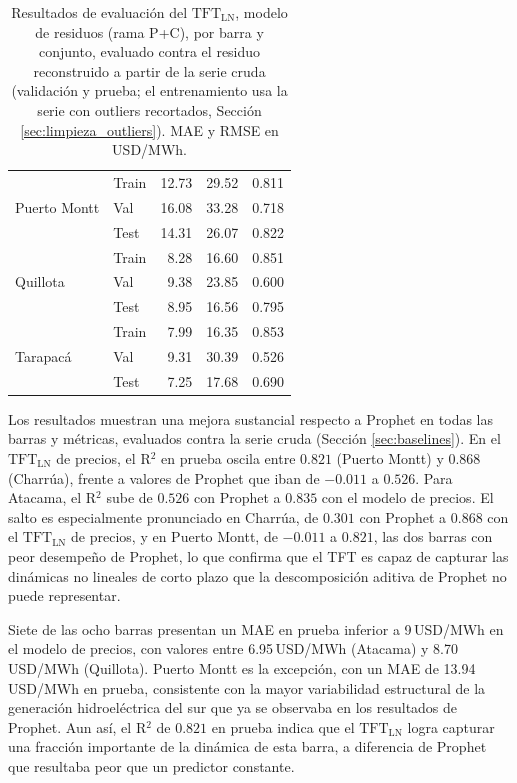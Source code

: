 \begin{table}[htbp]
\begin{tabular}{llrrr}
        \midrule
        \multirow{3}{*}{Puerto Montt}
            & Train & 12.73 & 29.52 & 0.811 \\
            & Val   & 16.08 & 33.28 & 0.718 \\
            & Test  & 14.31 & 26.07 & 0.822 \\
        \midrule
        \multirow{3}{*}{Quillota}
            & Train & 8.28 & 16.60 & 0.851 \\
            & Val   & 9.38 & 23.85 & 0.600 \\
            & Test  & 8.95 & 16.56 & 0.795 \\
        \midrule
        \multirow{3}{*}{Tarapacá}
            & Train & 7.99 & 16.35 & 0.853 \\
            & Val   & 9.31 & 30.39 & 0.526 \\
            & Test  & 7.25 & 17.68 & 0.690 \\
        \bottomrule
    \end{tabular}
    \vspace{0.2cm}
    \caption{Resultados de evaluación del $\text{TFT}_\text{LN}$, modelo de residuos (rama P+C), por barra y conjunto, evaluado contra el residuo reconstruido a partir de la serie cruda (validación y prueba; el entrenamiento usa la serie con outliers recortados, Sección \ref{sec:limpieza_outliers}). MAE y RMSE en USD/MWh.}
    \label{tab:tft_residuos_resultados}
\end{table}
 
Los resultados muestran una mejora sustancial respecto a Prophet en todas las barras y métricas, evaluados contra la serie cruda (Sección \ref{sec:baselines}). En el $\text{TFT}_\text{LN}$ de precios, el R$^2$ en prueba oscila entre $0.821$ (Puerto Montt) y $0.868$ (Charrúa), frente a valores de Prophet que iban de $-0.011$ a $0.526$. Para Atacama, el R$^2$ sube de $0.526$ con Prophet a $0.835$ con el modelo de precios. El salto es especialmente pronunciado en Charrúa, de $0.301$ con Prophet a $0.868$ con el $\text{TFT}_\text{LN}$ de precios, y en Puerto Montt, de $-0.011$ a $0.821$, las dos barras con peor desempeño de Prophet, lo que confirma que el TFT es capaz de capturar las dinámicas no lineales de corto plazo que la descomposición aditiva de Prophet no puede representar.

Siete de las ocho barras presentan un MAE en prueba inferior a 9\,USD/MWh en el modelo de precios, con valores entre 6.95\,USD/MWh (Atacama) y 8.70\,USD/MWh (Quillota). Puerto Montt es la excepción, con un MAE de 13.94\,USD/MWh en prueba, consistente con la mayor variabilidad estructural de la generación hidroeléctrica del sur que ya se observaba en los resultados de Prophet. Aun así, el R$^2$ de $0.821$ en prueba indica que el $\text{TFT}_\text{LN}$ logra capturar una fracción importante de la dinámica de esta barra, a diferencia de Prophet que resultaba peor que un predictor constante.


